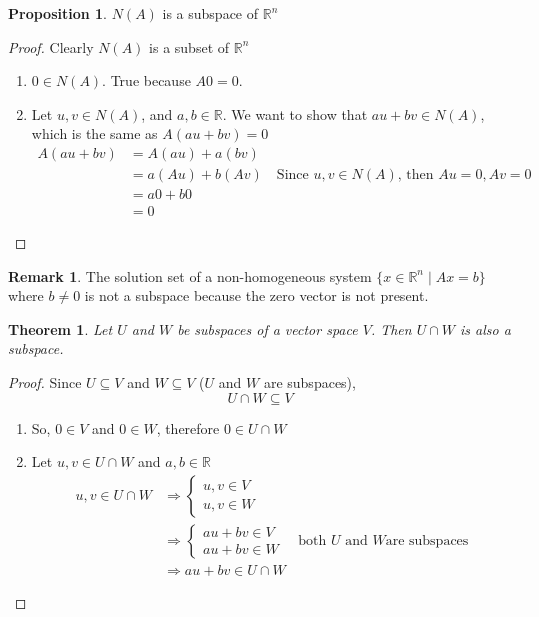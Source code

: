 \documentclass{report}
\newtheorem{_thm}{Theorem}
\theoremstyle{definition}
\newtheorem{_rem}{Remark}
\newtheorem{_prop}{Proposition}
\begin{document}
\begin{_prop}
$N(A)$ is a subspace of $\mathbb{R}^n$
\end{_prop}
\begin{proof}
Clearly $N(A)$ is a subset of $\mathbb{R}^n$
\begin{enumerate}[i]
 \item $0\in N(A)$. True because $A0=0$.
 \item Let $u,v\in N(A)$, and $a,b\in \mathbb{R}$.
 We want to show that $au+bv\in N(A)$, which is the same as $A(au+bv)=0$
 \begin{align*}
 A(au+bv) &= A(au)+a(bv) \\
 &= a(Au)+b(Av) \quad \text{Since } u,v\in N(A) \text{, then } Au=0, Av=0 \\
 &= a0+b0 \\
 &= 0
 \end{align*}
\end{enumerate}
\end{proof}

\begin{_rem}
The solution set of a non-homogeneous system $\{x\in \mathbb{R}^n \mid Ax=b\}$ where $b\neq 0$ is not a subspace because the zero vector is not present.
\end{_rem}

\begin{_thm}
Let $U$ and $W$ be subspaces of a vector space $V$.
Then $U\cap W$ is also a subspace.
\end{_thm}

\begin{proof}
Since $U\subseteq V$ and $W\subseteq V$ ($U$ and $W$ are subspaces),
\[U\cap W\subseteq V\]
\begin{enumerate}[i]
 \item So, $0\in V$ and $0\in W$, therefore $0\in U\cap W$
 \item Let $u,v\in U\cap W$ and $a,b\in \mathbb{R}$
 \begin{align*}
  u,v\in U\cap W &\Rightarrow \left\{ 
  \begin{array}{l}
    u,v\in V \\
    u,v\in W
  \end{array} \right. \\
  &\Rightarrow \left\{ 
  \begin{array}{l}
    au+bv\in V \\
    au+bv\in W
  \end{array} \right. \quad \text{both } U \text{ and } W \text{are subspaces} \\
  &\Rightarrow au+bv\in U \cap W
 \end{align*}
\end{enumerate}
\end{proof}
\end{document}
